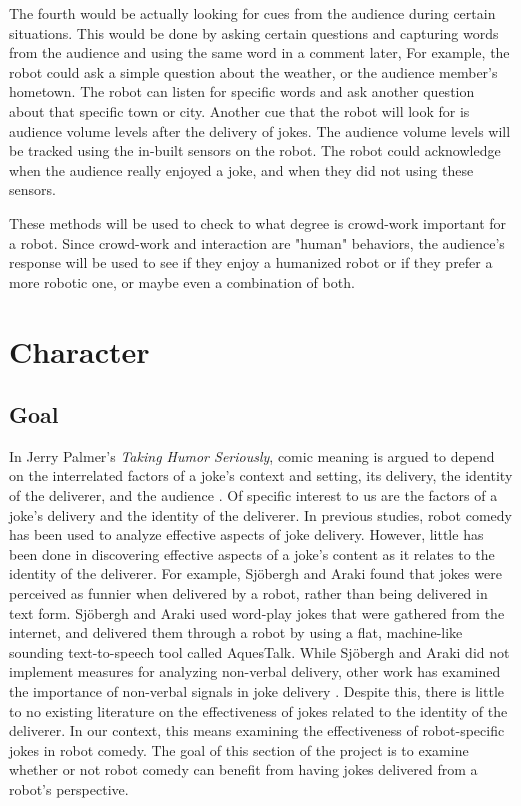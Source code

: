 \documentclass[onecolumn, draftclsnofoot,10pt, compsoc]{IEEEtran}
\begin{document}
The fourth would be actually looking for cues from the audience during certain situations. This would be done by asking certain questions and capturing words from the audience and using the same word in a comment later,  For example, the robot could ask a simple question about the weather, or the audience member's hometown. The robot can listen for specific words and ask another question about that specific town or city. Another cue that the robot will look for is audience volume levels after the delivery of jokes. The audience volume levels will be tracked using the in-built sensors on the robot. The robot could acknowledge when the audience really enjoyed a joke, and when they did not using these sensors.

These methods will be used to check to what degree is crowd-work important for a robot. Since crowd-work and interaction are "human" behaviors, the audience's response will be used to see if they enjoy a humanized robot or if they prefer a more robotic one, or maybe even a combination of both.


\section{Character}
\subsection{Goal}
In Jerry Palmer's \textit{Taking Humor Seriously}, comic meaning is argued to depend on the interrelated factors of a joke's context and setting, its delivery, the identity of the deliverer, and the audience \cite{Palmer:1993}.
Of specific interest to us are the factors of a joke's delivery and the identity of the deliverer.
In previous studies, robot comedy has been used to analyze effective aspects of joke delivery.
However, little has been done in discovering effective aspects of a joke's content as it relates to the identity of the deliverer.
For example, Sj\"{o}bergh and Araki \cite{RobotsMakeThings:2008} found that jokes were perceived as funnier when delivered by a robot, rather than being delivered in text form.
Sj\"{o}bergh and Araki used word-play jokes that were gathered from the internet, and delivered them through a robot by using a flat, machine-like sounding text-to-speech tool called AquesTalk.
While Sj\"{o}bergh and Araki did not implement measures for analyzing non-verbal delivery, other work has examined the importance of non-verbal signals in joke delivery \cite{KatevasRobot:2014} \cite{KnightEightLessons:2011}.
Despite this, there is little to no existing literature on the effectiveness of jokes related to the identity of the deliverer.
In our context, this means examining the effectiveness of robot-specific jokes in robot comedy.
The goal of this section of the project is to examine whether or not robot comedy can benefit from having jokes delivered from a robot's perspective.
\end{document}
